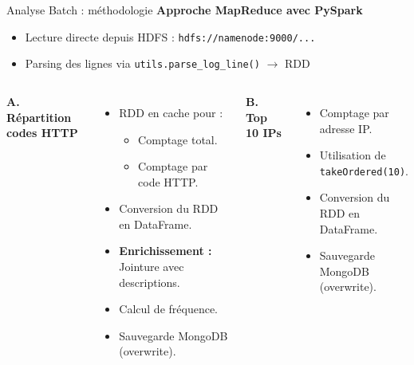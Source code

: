 \documentclass[aspectratio=169]{beamer}
\begin{document}
\begin{frame}[fragile]{Analyse Batch : méthodologie}
    \textbf{Approche MapReduce avec PySpark}
    \begin{itemize}
        \item Lecture directe depuis HDFS : \texttt{hdfs://namenode:9000/...}
        \item Parsing des lignes via \texttt{utils.parse\_log\_line()} $\rightarrow$ RDD
    \end{itemize}
    
    \vspace{0.1cm}
    
    \begin{columns}[t]
        \textbf{A. Répartition codes HTTP}
        \begin{itemize}
            \item RDD en cache pour :
            \begin{itemize}
                \item Comptage total.
                \item Comptage par code HTTP.
            \end{itemize}
            \item Conversion du RDD en DataFrame.
            \item \textbf{Enrichissement :} Jointure avec descriptions.
            \item Calcul de fréquence.
            \item Sauvegarde MongoDB (overwrite).
        \end{itemize}

        \textbf{B. Top 10 IPs}
        \begin{itemize}
            \item Comptage par adresse IP.
            \item Utilisation de \texttt{takeOrdered(10)}.
            \item Conversion du RDD en DataFrame.
            \item Sauvegarde MongoDB (overwrite).
        \end{itemize}
    \end{columns}
\end{frame}
\end{document}
